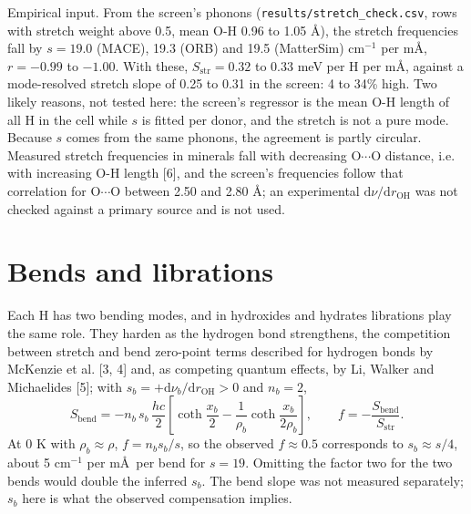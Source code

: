 \documentclass[11pt,a4paper]{article}
\begin{document}
Empirical input. From the screen's phonons (\texttt{results/stretch\_check.csv}, rows with stretch weight above 0.5, mean O-H 0.96 to 1.05 \AA), the stretch frequencies fall by $s = 19.0$ (MACE), 19.3 (ORB) and 19.5 (MatterSim) cm$^{-1}$ per m\AA, $r = -0.99$ to $-1.00$. With these, $S_{\mathrm{str}} = 0.32$ to $0.33$ meV per H per m\AA, against a mode-resolved stretch slope of 0.25 to 0.31 in the screen: 4 to 34\% high. Two likely reasons, not tested here: the screen's regressor is the mean O-H length of all H in the cell while $s$ is fitted per donor, and the stretch is not a pure mode. Because $s$ comes from the same phonons, the agreement is partly circular. Measured stretch frequencies in minerals fall with decreasing O$\cdots$O distance, i.e. with increasing O-H length [6], and the screen's frequencies follow that correlation for O$\cdots$O between 2.50 and 2.80 \AA; an experimental $\mathrm d\nu/\mathrm d r_{\mathrm{OH}}$ was not checked against a primary source and is not used.

\section{Bends and librations}
Each H has two bending modes, and in hydroxides and hydrates librations play the same role. They harden as the hydrogen bond strengthens, the competition between stretch and bend zero-point terms described for hydrogen bonds by McKenzie et al. [3, 4] and, as competing quantum effects, by Li, Walker and Michaelides [5]; with $s_b = +\mathrm d\nu_b/\mathrm d r_{\mathrm{OH}} > 0$ and $n_b = 2$,
\begin{equation}
S_{\mathrm{bend}} = -n_b\,s_b\,\frac{hc}{2}\left[\coth\frac{x_b}{2} - \frac{1}{\rho_b}\coth\frac{x_b}{2\rho_b}\right], \qquad f = -\frac{S_{\mathrm{bend}}}{S_{\mathrm{str}}}.
\end{equation}
At 0 K with $\rho_b \approx \rho$, $f = n_b s_b/s$, so the observed $f \approx 0.5$ corresponds to $s_b \approx s/4$, about 5 cm$^{-1}$ per m\AA\ per bend for $s = 19$. Omitting the factor two for the two bends would double the inferred $s_b$. The bend slope was not measured separately; $s_b$ here is what the observed compensation implies.
\end{document}
